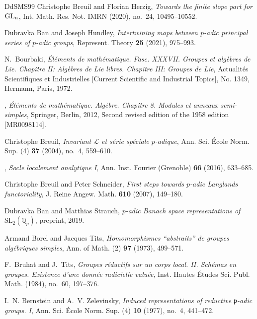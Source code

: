 \documentclass[a4paper]{amsart}
\numberwithin{equation}{section}
\theoremstyle{remark}
\theoremstyle{definition}
\begin{document}
\begin{thebibliography}{DdSMS99}
Christophe Breuil and Florian Herzig, \emph{Towards the finite slope part for
  {${\rm GL}_n$}}, Int. Math. Res. Not. IMRN (2020), no.~24, 10495--10552.

Dubravka Ban and Joseph Hundley, \emph{Intertwining maps between {$p$}-adic
  principal series of {$p$}-adic groups}, Represent. Theory \textbf{25} (2021),
  975--993. 

N.~Bourbaki, \emph{\'{E}l\'{e}ments de math\'{e}matique. {F}asc. {XXXVII}.
  {G}roupes et alg\`ebres de {L}ie. {C}hapitre {II}: {A}lg\`ebres de {L}ie
  libres. {C}hapitre {III}: {G}roupes de {L}ie}, Actualit\'{e}s Scientifiques
  et Industrielles [Current Scientific and Industrial Topics], No. 1349,
  Hermann, Paris, 1972. 

\bysame, \emph{\'{E}l\'{e}ments de math\'{e}matique. {A}lg\`ebre. {C}hapitre 8.
  {M}odules et anneaux semi-simples}, Springer, Berlin, 2012, Second revised
  edition of the 1958 edition [MR0098114]. 

Christophe Breuil, \emph{Invariant {$\mathscr L$} et s\'{e}rie sp\'{e}ciale
  {$p$}-adique}, Ann. Sci. \'{E}cole Norm. Sup. (4) \textbf{37} (2004), no.~4,
  559--610. 

\bysame, \emph{Socle localement analytique {I}}, Ann. Inst. Fourier (Grenoble)
  \textbf{66} (2016), 633--685. 

Christophe Breuil and Peter Schneider, \emph{First steps towards {$p$}-adic
  {L}anglands functoriality}, J. Reine Angew. Math. \textbf{610} (2007),
  149--180. 

Dubravka Ban and Matthias Strauch, \emph{$p$-adic {B}anach space
  representations of {$\mathrm{SL}_2({\mathbb Q}_p)$}}, preprint, 2019.

Armand Borel and Jacques Tits, \emph{Homomorphismes ``abstraits'' de groupes
  alg\'{e}briques simples}, Ann. of Math. (2) \textbf{97} (1973), 499--571.

F.~Bruhat and J.~Tits, \emph{Groupes r\'eductifs sur un corps local. {II}.
  {S}ch\'emas en groupes. {E}xistence d'une donn\'ee radicielle valu\'ee},
  Inst. Hautes \'Etudes Sci. Publ. Math. (1984), no.~60, 197--376. 

I.~N. Bernstein and A.~V. Zelevinsky, \emph{Induced representations of
  reductive {${\mathfrak p}$}-adic groups. {I}}, Ann. Sci. \'Ecole Norm. Sup.
  (4) \textbf{10} (1977), no.~4, 441--472. 


\end{thebibliography}
\end{document}
